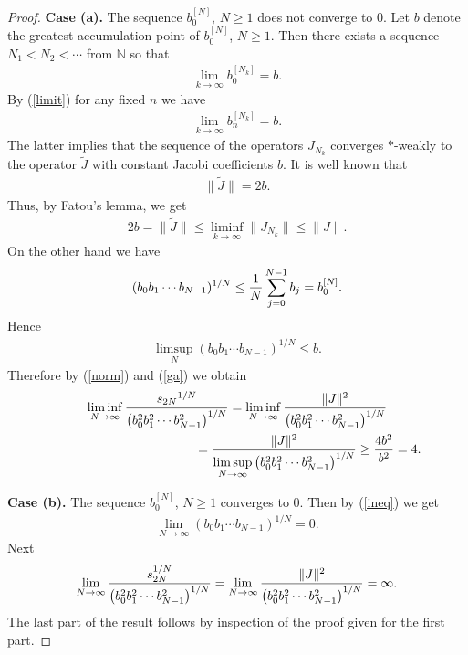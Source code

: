 \documentclass[pdftex]{sigma}
\newcommand{\N}{\mathbb{N}}
\numberwithin{equation}{section}
\begin{document}
\begin{proof}
{\bf Case (a).} The sequence $b_0^{[N]}$, $N\ge 1$ does not converge to $0$. Let $b$ denote the greatest accumulation point of $b_0^{[N]}$, $N\ge 1$. Then there exists a sequence $N_1<N_2<\cdots$ from $\N$ so that
\begin{gather*}
\lim_{{k\to\infty}}b_{0}^{[N_k]}=b.
\end{gather*}
 By (\ref{limit}) for any fixed $n$ we have
\begin{gather*}
\lim_{{k\to\infty}}b_{n}^{[N_k]}=b.
\end{gather*}
The latter implies that the sequence of the operators $J_{N_k}$ converges $*$-weakly to the operator $\widetilde{J}$ with constant Jacobi coefficients $b$. It is well known that
\begin{gather*}
\big\|\widetilde{J}\big\|=2b.
\end{gather*}
 Thus, by Fatou's lemma, we get
\begin{gather}\label{norm}
2b=\big\|\widetilde{J}\big\|\le \liminf_{k\to\infty} \|J_{N_k}\|\le \|J\|.
\end{gather}
On the other hand we have
\begin{gather}\label{ineq}
(b_0b_1\cdots b_{N-1})^{1/ N}\le {1\over N}\sum_{j=0}^{N-1}b_j=b_0^{[N]}.
\end{gather}
Hence
\begin{gather}\label{ga}
\limsup_N (b_0b_1\cdots b_{N-1})^{1/ N}\le b.
\end{gather}
Therefore by (\ref{norm}) and (\ref{ga}) we obtain
\begin{gather*}\liminf_{N\to\infty} {{s_{2N}}^{1/N}\over \big(b_0^2b_1^2\cdots b_{N-1}^2\big)^{1/ N}}=
\liminf_{N\to\infty}{\|J\|^2\over \big(b_0^2b_1^2\cdots b_{N-1}^2\big)^{1/ N}}\\
\hphantom{\liminf_{N\to\infty} {{s_{2N}}^{1/N}\over \big(b_0^2b_1^2\cdots b_{N-1}^2\big)^{1/ N}}}{}
= {\|J\|^2\over \limsup\limits_{N\to\infty} \big(b_0^2b_1^2\cdots b_{N-1}^2\big)^{1/ N}}\ge {4b^2\over b^2}=4.
\end{gather*}

{\bf Case (b).} The sequence $b_0^{[N]}$, $N\ge 1$ converges to $0$. Then by (\ref{ineq}) we get
\begin{gather*}
\lim_{N\to\infty}(b_0b_1\cdots b_{N-1})^{1/ N}=0.
\end{gather*}
 Next
\begin{gather*}
\lim_{N\to\infty}{s_{2N}^{1/N}\over \big(b_0^2b_1^2\cdots b_{N-1}^2\big)^{1/ N}}=\lim_{N\to\infty}{\|J\|^2\over \big(b_0^2b^2_1\cdots b^2_{N-1}\big)^{1/ N}}=\infty.
\end{gather*}
The last part of the result follows by inspection of the proof given for the first part.
\end{proof}
\end{document}
